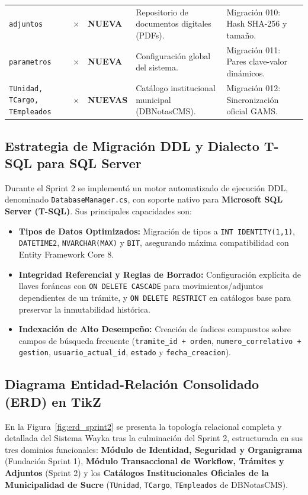 \documentclass[a4paper,12pt]{article}
\begin{document}
\begin{table}[htbp]
\begin{tabularx}{\linewidth}{@{}>{\raggedright\arraybackslash}p{2.6cm}>{\centering\arraybackslash}p{1.25cm}>{\centering\arraybackslash}p{1.45cm}>{\raggedright\arraybackslash}p{4.3cm}Y@{}}
\texttt{adjuntos} & \color{colorAlerta}$\times$ & \textbf{\color{colorExito}NUEVA} & Repositorio de documentos digitales (PDFs). & Migración 010: Hash SHA-256 y tamaño. \\
\texttt{parametros} & \color{colorAlerta}$\times$ & \textbf{\color{colorExito}NUEVA} & Configuración global del sistema. & Migración 011: Pares clave-valor dinámicos. \\
\texttt{TUnidad, TCargo, TEmpleados} & \color{colorAlerta}$\times$ & \textbf{\color{colorExito}NUEVAS} & Catálogo institucional municipal (DBNotasCMS). & Migración 012: Sincronización oficial GAMS. \\
\bottomrule
\end{tabularx}
\end{table}

\subsection{Estrategia de Migración DDL y Dialecto T-SQL para SQL Server}
Durante el Sprint 2 se implementó un motor automatizado de ejecución DDL, denominado \texttt{DatabaseManager.cs}, con soporte nativo para \textbf{Microsoft SQL Server (T-SQL)}. Sus principales capacidades son:
\begin{itemize}[leftmargin=1.5em]
    \item \textbf{Tipos de Datos Optimizados:} Migración de tipos a \texttt{INT IDENTITY(1,1)}, \texttt{DATETIME2}, \texttt{NVARCHAR(MAX)} y \texttt{BIT}, asegurando máxima compatibilidad con Entity Framework Core 8.
    \item \textbf{Integridad Referencial y Reglas de Borrado:} Configuración explícita de llaves foráneas con \texttt{ON DELETE CASCADE} para movimientos/adjuntos dependientes de un trámite, y \texttt{ON DELETE RESTRICT} en catálogos base para preservar la inmutabilidad histórica.
    \item \textbf{Indexación de Alto Desempeño:} Creación de índices compuestos sobre campos de búsqueda frecuente (\texttt{tramite\_id + orden}, \texttt{numero\_correlativo + gestion}, \texttt{usuario\_actual\_id}, \texttt{estado} y \texttt{fecha\_creacion}).
\end{itemize}

\subsection{Diagrama Entidad-Relación Consolidado (ERD) en TikZ}
En la Figura~\ref{fig:erd_sprint2} se presenta la topología relacional completa y detallada del Sistema Wayka tras la culminación del Sprint 2, estructurada en sus tres dominios funcionales: \textbf{Módulo de Identidad, Seguridad y Organigrama} (Fundación Sprint 1), \textbf{Módulo Transaccional de Workflow, Trámites y Adjuntos} (Sprint 2) y los \textbf{Catálogos Institucionales Oficiales de la Municipalidad de Sucre} (\texttt{TUnidad}, \texttt{TCargo}, \texttt{TEmpleados} de DBNotasCMS).
\end{document}
